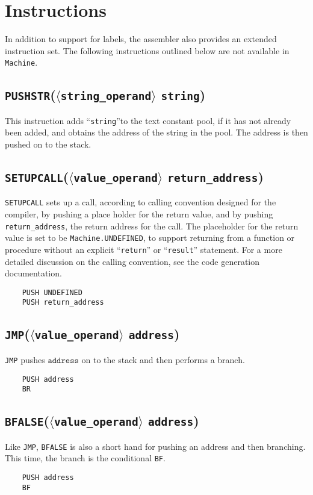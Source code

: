 \documentclass[oneside]{amsart}
\theoremstyle{definition}
\theoremstyle{remark}
\numberwithin{equation}{section}
\begin{document}
\section{Instructions}
In addition to support for labels, the assembler also provides an extended instruction set. The
following instructions outlined below are not available in \texttt{Machine}.
\subsection{\texttt{PUSHSTR}(\texttt{$\langle$string_operand$\rangle$} \texttt{string})}
This instruction adds ``\texttt{string}''to the text constant pool, if it has not already been
added, and obtains the address of the string in the pool. The address is then pushed on to the
stack.
\subsection{\texttt{SETUPCALL}(\texttt{$\langle$value_operand$\rangle$} \texttt{return_address})}
\texttt{SETUPCALL} sets up a call, according to calling convention designed for the compiler, by
pushing a place holder for the return value, and by pushing \texttt{return_address}, the return
address for the call. The placeholder for the return value is set to be \texttt{Machine.UNDEFINED},
to support returning from a function or procedure without an explicit ``\texttt{return}'' or
``\texttt{result}'' statement. For a more detailed discussion on the calling convention, see the
code generation documentation.
\begin{lstlisting}
    PUSH UNDEFINED
    PUSH return_address
\end{lstlisting}
\subsection{\texttt{JMP}(\texttt{$\langle$value_operand$\rangle$} \texttt{address})}
\texttt{JMP} pushes $\texttt{address}$ on to the stack and then performs a branch.
\begin{lstlisting}
    PUSH address
    BR
\end{lstlisting}
\subsection{\texttt{BFALSE}(\texttt{$\langle$value_operand$\rangle$} \texttt{address})}
Like \texttt{JMP}, \texttt{BFALSE} is also a short hand for pushing an address and then branching.
This time, the branch is the conditional \texttt{BF}.
\begin{lstlisting}
    PUSH address
    BF
\end{lstlisting}
\end{document}
